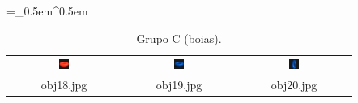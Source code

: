 \begin{table}[H]
  \centering
  \caption{Grupo C (boias).}
  \tabulinesep =_0.5em^0.5em
  \everyrow{\tabucline[0.4pt]-}
  \begin{tabu}{|ccc|}
    \includegraphics[width=0.1\textwidth,height=0.1\textwidth]{imagens/coil_100/boias/obj47__0.png} &
    \includegraphics[width=0.1\textwidth,height=0.1\textwidth]{imagens/coil_100/boias/obj94__0.png} &
    \includegraphics[width=0.1\textwidth,height=0.1\textwidth]{imagens/coil_100/boias/obj94__0_1.png}
    \\
    \scriptsize{obj18.jpg} & \scriptsize{obj19.jpg} & \scriptsize{obj20.jpg}
  \end{tabu}
\end{table}

